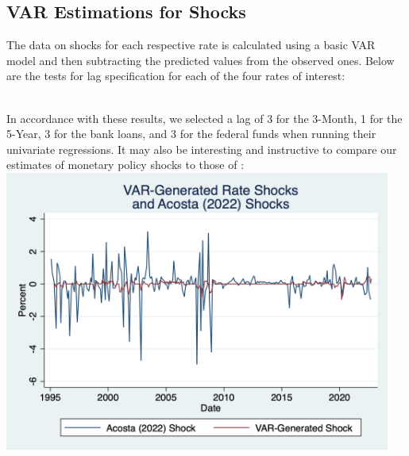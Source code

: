 \documentclass[12pt,final]{article}
\begin{document}
\subsection{VAR Estimations for Shocks}
The data on shocks for each respective rate is calculated using a basic VAR model and then subtracting the predicted values from the observed ones. Below are the tests for lag specification for each of the four rates of interest:



 \\
In accordance with these results, we selected a lag of 3 for the 3-Month, 1 for the 5-Year, 3 for the bank loans, and 3 for the federal funds when running their univariate regressions. It may also be interesting and instructive to compare our estimates of monetary policy shocks to those of \citep{Acosta2022}: \\
\includegraphics[width=5in]{shock_comparison.png}
\end{document}
